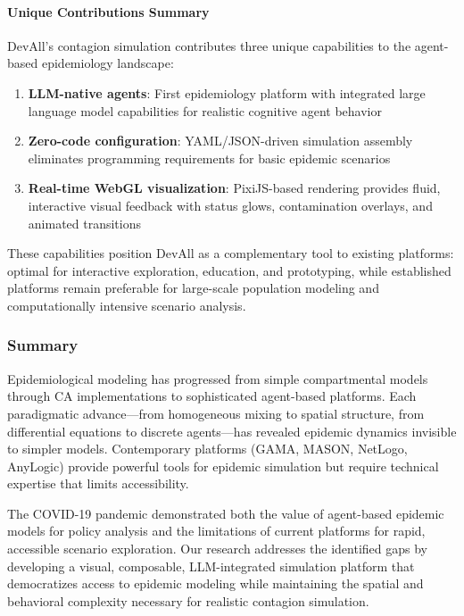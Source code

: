 \paragraph{Unique Contributions Summary}
DevAll's contagion simulation contributes three unique capabilities to the agent-based epidemiology landscape:
\begin{enumerate}
    \item \textbf{LLM-native agents}: First epidemiology platform with integrated large language model capabilities for realistic cognitive agent behavior
    \item \textbf{Zero-code configuration}: YAML/JSON-driven simulation assembly eliminates programming requirements for basic epidemic scenarios
    \item \textbf{Real-time WebGL visualization}: PixiJS-based rendering provides fluid, interactive visual feedback with status glows, contamination overlays, and animated transitions
\end{enumerate}

These capabilities position DevAll as a complementary tool to existing platforms: optimal for interactive exploration, education, and prototyping, while established platforms remain preferable for large-scale population modeling and computationally intensive scenario analysis.

\subsubsection{Summary}

Epidemiological modeling has progressed from simple compartmental models through CA implementations to sophisticated agent-based platforms. Each paradigmatic advance---from homogeneous mixing to spatial structure, from differential equations to discrete agents---has revealed epidemic dynamics invisible to simpler models. Contemporary platforms (GAMA, MASON, NetLogo, AnyLogic) provide powerful tools for epidemic simulation but require technical expertise that limits accessibility.

The COVID-19 pandemic demonstrated both the value of agent-based epidemic models for policy analysis and the limitations of current platforms for rapid, accessible scenario exploration. Our research addresses the identified gaps by developing a visual, composable, LLM-integrated simulation platform that democratizes access to epidemic modeling while maintaining the spatial and behavioral complexity necessary for realistic contagion simulation.
